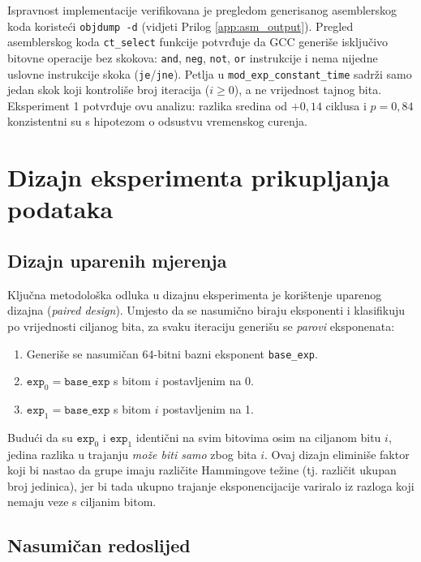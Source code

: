 Ispravnost implementacije verifikovana je pregledom generisanog asemblerskog koda koristeći \texttt{objdump -d} (vidjeti Prilog \ref{app:asm_output}). Pregled asemblerskog koda \texttt{ct\_select} funkcije potvrđuje da GCC generiše isključivo bitovne operacije bez skokova: \texttt{and}, \texttt{neg}, \texttt{not}, \texttt{or} instrukcije i nema nijedne uslovne instrukcije skoka (\texttt{je}/\texttt{jne}). Petlja u \texttt{mod\_exp\_constant\_time} sadrži samo jedan skok koji kontroliše broj iteracija ($i \geq 0$), a ne vrijednost tajnog bita. Eksperiment 1 potvrđuje ovu analizu: razlika sredina od $+0{,}14$ ciklusa i $p = 0{,}84$ konzistentni su s hipotezom o odsustvu vremenskog curenja.

\section{Dizajn eksperimenta prikupljanja podataka}
\label{sec:exp_design}

\subsection{Dizajn uparenih mjerenja}

Ključna metodološka odluka u dizajnu eksperimenta je korištenje uparenog dizajna (\textit{paired design}). Umjesto da se nasumično biraju eksponenti i klasifikuju po vrijednosti ciljanog bita, za svaku iteraciju generišu se \textit{parovi} eksponenata:

\begin{enumerate}
\item Generiše se nasumičan 64-bitni bazni eksponent \texttt{base\_exp}.
\item $\texttt{exp}_0 = \texttt{base\_exp}$ s bitom $i$ postavljenim na 0.
\item $\texttt{exp}_1 = \texttt{base\_exp}$ s bitom $i$ postavljenim na 1.
\end{enumerate}

Budući da su $\texttt{exp}_0$ i $\texttt{exp}_1$ identični na svim bitovima osim na ciljanom bitu $i$, jedina razlika u trajanju \textit{može biti samo} zbog bita $i$. Ovaj dizajn eliminiše faktor koji bi nastao da grupe imaju različite Hammingove težine (tj. različit ukupan broj jedinica), jer bi tada ukupno trajanje eksponencijacije variralo iz razloga koji nemaju veze s ciljanim bitom.

\subsection{Nasumičan redoslijed}

